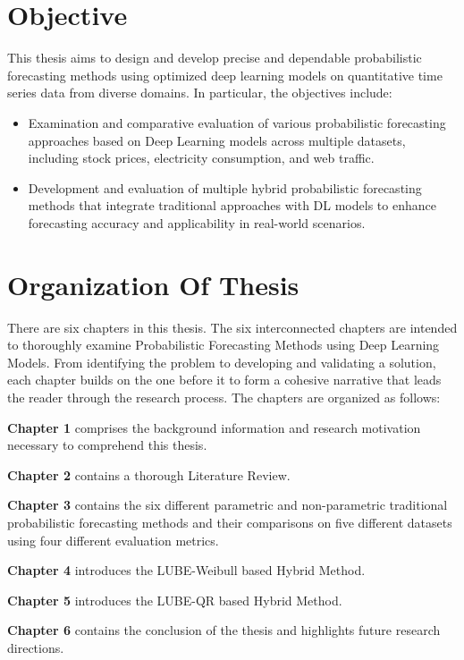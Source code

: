 \section{Objective}
This thesis aims to design and develop precise and dependable probabilistic forecasting methods using optimized deep learning models on quantitative time series data from diverse domains.
In particular, the objectives include:
\begin{itemize}
    \item Examination and comparative evaluation of various probabilistic forecasting approaches based on Deep Learning models across multiple datasets, including stock prices, electricity consumption, and web traffic.
    \item Development and evaluation of multiple hybrid probabilistic forecasting methods that integrate traditional approaches with DL models to enhance forecasting accuracy and applicability in real-world scenarios.
\end{itemize}



\section{Organization Of Thesis}
There are six chapters in this thesis. The six interconnected chapters are intended to
thoroughly examine Probabilistic Forecasting Methods using Deep Learning Models. From identifying the problem to developing and validating a solution, each chapter builds on the one before it to form a cohesive narrative that leads the reader through the research process. The chapters are
organized as follows:

\textbf{Chapter 1} comprises the background information and research motivation necessary to comprehend this thesis. 

\textbf{Chapter 2} contains a thorough Literature Review.

\textbf{Chapter 3} contains the six different parametric and non-parametric traditional probabilistic forecasting methods and their comparisons on five different datasets using four different evaluation metrics.

\textbf{Chapter 4} introduces the LUBE-Weibull based Hybrid Method.

\textbf{Chapter 5} introduces the LUBE-QR based Hybrid Method.

\textbf{Chapter 6} contains the conclusion of the thesis and highlights future research directions.

